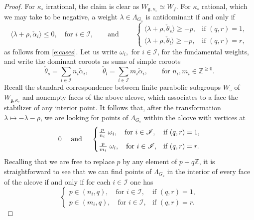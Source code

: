\documentclass[11pt,reqno]{amsart}
\newcommand{\halpha}{\check{\alpha}}
\newcommand{\fg}{\mathfrak{g}}
\theoremstyle{remark}
\numberwithin{equation}{section}
\begin{document}
\begin{proof} For $\kappa_{\circ}$ irrational, the claim is clear as $W_{\fg, 
		\kappa_{\circ}} \simeq W_f$. For $\kappa_{\circ}$ rational, which we 
	may take 
	to be negative, a weight $\lambda \in \Lambda_{G_s}$ is antidominant if and 
	only if 
	\[ \langle \lambda + \rho, \halpha_i \rangle \leqslant 0, 
	\quad 
	\text{for } i \in \mathscr{I}, \quad \quad  \text{and } \quad \quad 
	\begin{cases} 
	\langle  \lambda + \rho, \check{\theta}_s \rangle \geqslant -p , & \text{if 
	} 
	(q,r) = 1, \\ \langle  \lambda + \rho, \check{\theta}_l 
	\rangle \geqslant -p, & \text{if } (q,r) = r, \end{cases}
	\]
	as follows from \eqref{e:cases}. Let us write $\omega_i,$ for $i \in 
	\mathscr{I}$, for the 
	fundamental 
	weights, and write the dominant coroots as sums of simple coroots
	\[ \check{\theta}_s = \sum_{i \in \mathscr{I}} n_i \halpha_i, \quad \quad 
	\check{\theta}_l 
	= \sum_{i \in \mathscr{I}} m_i \halpha_i, \quad \quad \text{for } n_i, m_i 
	\in 
	\mathbb{Z}^{\geqslant 
		0}.
	\] 	
	Recall the standard correspondence between finite parabolic subgroups 
	$W_\circ$ of $W_{\fg, \kappa_{\circ}}$ and nonempty faces of the above 
	alcove, which 
	associates to a face the stabilizer of any interior point. It follows that, 
	after the transformation $\lambda \mapsto -\lambda - 
	\rho$, we 
	are looking for points of $\Lambda_{G_s}$ within the alcove with 
	vertices at
	\[ 0  \quad  \text{ and }  \quad \begin{cases} \frac{p}{n_i} \hspace{1mm}
	\omega_i, \quad \text{for } i \in \mathscr{I}, 
	& \text{if } (q,r) = 
	1, \\[2mm] \frac{p}{m_i} \hspace{1mm} \omega_i,  \quad \text{for } i \in 
	\mathscr{I}, 
	&\text{if } (q,r) 
	= r. 
	\end{cases}
	\]
	Recalling that we are free to replace $p$ by any element of $p + q 
	\mathbb{Z}$, 
	it is straightforward to see that we can find points of $\Lambda_{G_s}$ in 
	the 
	interior of every face of the alcove if and only if for each $i \in 
	\mathscr{I}$ one has%
	\[ \begin{cases} p \in (n_i, q), \quad \text{for } i \in \mathscr{I}, & 
	\text{if } (q,r) = 1, \\ p \in (m_i, q),\quad \text{for } i \in 
	\mathscr{I},  
	& 
	\text{if } (q,r) = r. \end{cases} 
\]
\end{proof}
\end{document}
